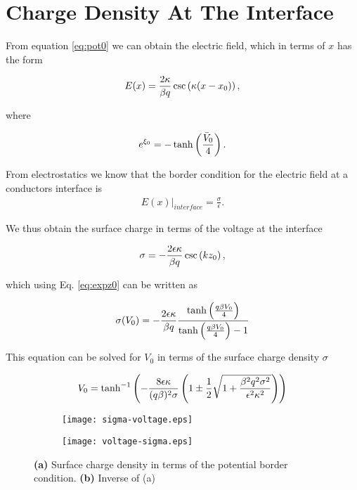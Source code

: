 \section{Charge Density At The Interface}

From equation \ref{eq:pot0} we can obtain the electric field, which in terms of $x$ has the form

\begin{align}
E(x) =  \frac{2\kappa}{\beta q} \csc\left({\kappa(x-x_0)}\right),
\label{eq:pot0}
\end{align}

where

\begin{align}
e^{\xi_0} = -\tanh\left({\frac{\bar{V}_0}{4}}\right).
\label{eq:expz0}
\end{align}

From electrostatics we know that the border condition for the electric field at a conductors interface is
\begin{align}
	E(x)\big|_{interface} = \frac{\sigma}{\epsilon}.
\end{align}

We thus obtain the surface charge in terms of the voltage at the interface

\begin{align}
	\sigma = -\frac{2 \epsilon \kappa}{\beta q} \csc\left({kz_0}\right),
\end{align}

which using Eq. \ref{eq:expz0} can be written as

\begin{align}
	\sigma(V_0) = -\frac{2 \epsilon \kappa}{\beta q} \frac{\tanh\left({\frac{q\beta V_0}{4}}\right)}{\tanh\left({\frac{q\beta V_0}{4}}\right)-1}
\end{align}

This equation can be solved for $V_0$ in terms of the surface charge density $\sigma$

\begin{align}
	V_0 = \tanh^{-1}\left({-\frac{8\epsilon\kappa}{(q \beta)^2 \sigma} \left({1 \pm \frac{1}{2}\sqrt{1+\frac{\beta^2 q^2\sigma^2}{\epsilon^2\kappa^2}}}\right)}\right)
\end{align}


\begin{figure}[htbp!]
\centering
\begin{subfigure}{.4\textwidth}
  \centering
  \texttt{[image: sigma-voltage.eps]}
  \caption{}
  \label{fig:sub1}
\end{subfigure}%
\begin{subfigure}{.4\textwidth}
  \centering
  \texttt{[image: voltage-sigma.eps]}
  \caption{}
  \label{fig:sub2}
\end{subfigure}
\caption{\textbf{(a)} Surface charge density in terms of the potential border condition. \textbf{(b)} Inverse of (a)}
\label{fig:test}
\end{figure}

